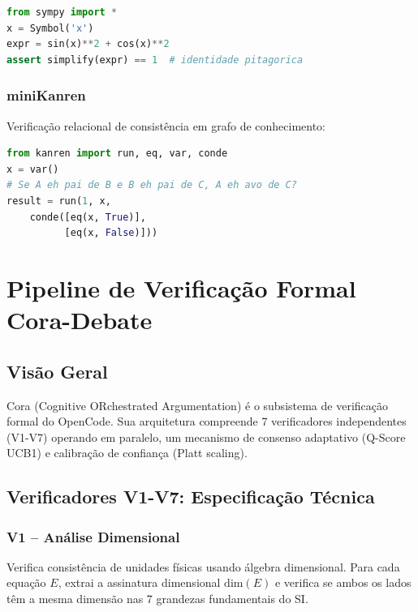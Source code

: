 \documentclass[12pt,a4paper,sumario=tradicional]{abntex2}
\begin{document}
\begin{lstlisting}[language=python]
from sympy import *
x = Symbol('x')
expr = sin(x)**2 + cos(x)**2
assert simplify(expr) == 1  # identidade pitagorica
\end{lstlisting}

\subsection{miniKanren}

Verificação relacional de consistência em grafo de conhecimento:

\begin{lstlisting}[language=python]
from kanren import run, eq, var, conde
x = var()
# Se A eh pai de B e B eh pai de C, A eh avo de C?
result = run(1, x,
    conde([eq(x, True)],
          [eq(x, False)]))
\end{lstlisting}

\chapter{Pipeline de Verificação Formal Cora-Debate}

\section{Visão Geral}

Cora (Cognitive ORchestrated Argumentation) é o subsistema de verificação formal do OpenCode. Sua arquitetura compreende 7 verificadores independentes (V1-V7) operando em paralelo, um mecanismo de consenso adaptativo (Q-Score UCB1) e calibração de confiança (Platt scaling).

\section{Verificadores V1-V7: Especificação Técnica}

\subsection{V1 -- Análise Dimensional}

Verifica consistência de unidades físicas usando álgebra dimensional. Para cada equação $E$, extrai a assinatura dimensional $\text{dim}(E)$ e verifica se ambos os lados têm a mesma dimensão nas 7 grandezas fundamentais do SI.
\end{document}

